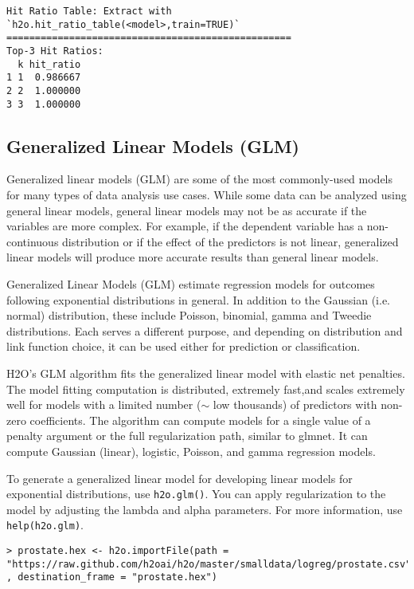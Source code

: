 {{\begin{lstlisting}[style=R]
Hit Ratio Table: Extract with `h2o.hit_ratio_table(<model>,train=TRUE)`
==================================================
Top-3 Hit Ratios:
  k hit_ratio
1 1  0.986667
2 2  1.000000
3 3  1.000000

\end{lstlisting}


\subsection{Generalized Linear Models (GLM)}


Generalized linear models (GLM) are some of the most commonly-used models for many types of data analysis use cases. While some data can be analyzed using general linear models, general linear models may not be as accurate if the variables are more complex. For example, if the dependent variable has a non-continuous distribution or if the effect of the predictors is not linear, generalized linear models will produce more accurate results than general linear models.

Generalized Linear Models (GLM) estimate regression models for outcomes following exponential distributions in general. In addition to the Gaussian (i.e. normal) distribution, these include Poisson, binomial, gamma and Tweedie distributions. Each serves a different purpose, and depending on distribution and link function choice, it can be used either for prediction or classification.

H2O's GLM algorithm fits the generalized linear model with elastic net penalties. The model fitting computation is distributed, extremely fast,and scales extremely well for models with a limited number ($\sim$ low thousands) of predictors with non-zero coefficients. The algorithm can compute models for a single value of a penalty argument or the full regularization path, similar to glmnet. It can compute Gaussian (linear), logistic, Poisson, and gamma regression models.

To generate a generalized linear model for developing linear models for exponential distributions, use {\texttt{h2o.glm()}}. You can apply regularization to the model by adjusting the lambda and alpha parameters.
For more information, use {\texttt{help(h2o.glm)}}.

\waterExampleInR
\medskip

\begin{lstlisting}[style=R]
> prostate.hex <- h2o.importFile(path = "https://raw.github.com/h2oai/h2o/master/smalldata/logreg/prostate.csv" , destination_frame = "prostate.hex")


\end{lstlisting}}}
